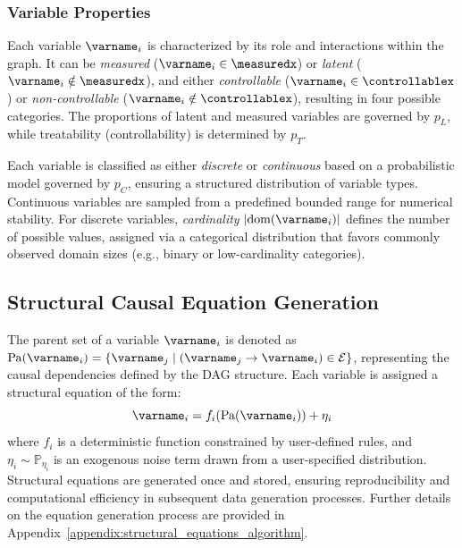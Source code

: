 \documentclass{article}
\newcommand{\pl}{p_L} %
\newcommand{\pt}{p_T} %
\newcommand{\pc}{p_C} %
\begin{document}
        \subsubsection{Variable Properties}  
            Each variable $ \varname_i $ is characterized by its role and interactions within the graph.  
            It can be \emph{measured} ($ \varname_i \in \measuredx $) or \emph{latent} ($ \varname_i \notin \measuredx $), and either \emph{controllable} ($ \varname_i \in \controllablex $) or \emph{non-controllable} ($ \varname_i \notin \controllablex $), resulting in four possible categories.  
            The proportions of latent and measured variables are governed by $ \pl $, while treatability (controllability) is determined by $ \pt $.  
            
            Each variable is classified as either \emph{discrete} or \emph{continuous} based on a probabilistic model governed by $ \pc $, ensuring a structured distribution of variable types.  
            Continuous variables are sampled from a predefined bounded range for numerical stability.  
            For discrete variables, \emph{cardinality} $ |\text{dom}(\varname_i)| $ defines the number of possible values, assigned via a categorical distribution that favors commonly observed domain sizes (e.g., binary or low-cardinality categories).  



    \subsection{Structural Causal Equation Generation}
        The parent set of a variable $ \varname_i $ is denoted as $ \text{Pa}(\varname_i) = \{ \varname_j \mid (\varname_j \to \varname_i) \in \mathcal{E} \} $, representing the causal dependencies defined by the DAG structure. 
        Each variable is assigned a structural equation of the form:
        \begin{equation*}
            \varname_i = f_i(\text{Pa}(\varname_i)) + \eta_i
        \end{equation*}
        where $ f_i $ is a deterministic function constrained by user-defined rules, and $ \eta_i \sim \mathbb{P}_{\eta_i} $ is an exogenous noise term drawn from a user-specified distribution. 
        Structural equations are generated once and stored, ensuring reproducibility and computational efficiency in subsequent data generation processes. 
        Further details on the equation generation process are provided in Appendix~\ref{appendix:structural_equations_algorithm}.
\end{document}
